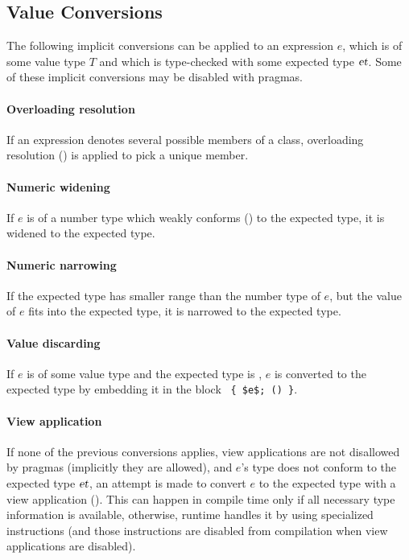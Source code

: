 \subsection{Value Conversions}
\label{sec:value-conversions}

The following implicit conversions can be applied to an expression $e$, which is of some value type $T$ and which is type-checked with some expected type $\mbox{\sl et}$. Some of these implicit conversions may be disabled with pragmas.

\paragraph{Overloading resolution}
If an expression denotes several possible members of a class, overloading resolution () is applied to pick a unique member. 
\paragraph{Numeric widening}
If $e$ is of a number type which weakly conforms () to the expected type, it is widened to the expected type. 

\paragraph{Numeric narrowing}
If the expected type has smaller range than the number type of $e$, but the value of $e$ fits into the expected type, it is narrowed to the expected type. 

\paragraph{Value discarding}
If $e$ is of some value type and the expected type is , $e$ is converted to the expected type by embedding it in the block ~\lstinline!{ $e$; () }!. 

\paragraph{View application}
If none of the previous conversions applies, view applications are not disallowed by pragmas (implicitly they are allowed), and $e$'s type does not conform to the expected type $\mbox{\sl et}$, an attempt is made to convert $e$ to the expected type with a view application (). This can happen in compile time only if all necessary type information is available, otherwise, runtime handles it by using specialized instructions (and those instructions are disabled from compilation when view applications are disabled). 

